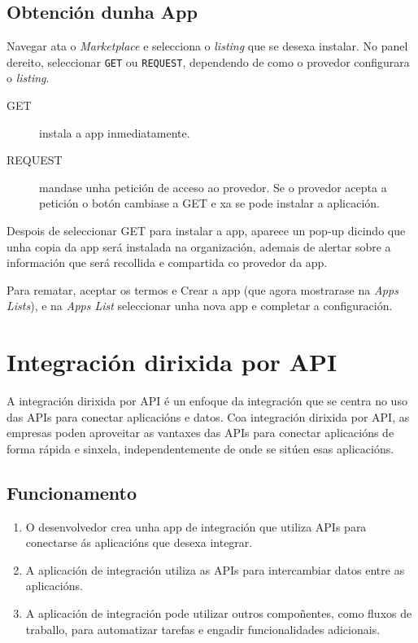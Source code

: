 \subsection{Obtención dunha App}

Navegar ata o \textit{Marketplace} e  selecciona o \textit{listing} que se desexa instalar. No panel dereito, seleccionar \texttt{GET} ou \texttt{REQUEST}, dependendo de como o provedor configurara o \textit{listing}.

\begin{description}
    \item[GET] instala a app inmediatamente.
    \item[REQUEST] mandase unha petición de acceso ao provedor. Se o provedor acepta a petición o botón cambiase a GET e xa se pode instalar a aplicación.
\end{description}

Despois de seleccionar GET para instalar a app, aparece un pop-up dicindo que unha copia da app será instalada na organización, ademais de alertar sobre a información que será recollida e compartida co provedor da app.

Para rematar, aceptar os termos e Crear a app (que agora mostrarase na \textit{Apps Lists}), e na \textit{Apps List} seleccionar unha nova app e completar a configuración.

\section{Integración dirixida por API}

    A integración dirixida por API é un enfoque da integración que se centra no uso das APIs para conectar aplicacións e datos. Coa integración dirixida por API, as empresas poden aproveitar as vantaxes das APIs para conectar aplicacións de forma rápida e sinxela, independentemente de onde se sitúen esas aplicacións.
   
\subsection{Funcionamento}

\begin{enumerate}
    \item O desenvolvedor crea unha app de integración que utiliza APIs para conectarse ás aplicacións que desexa integrar.
    \item A aplicación de integración utiliza as APIs para intercambiar datos entre as aplicacións.
    \item A aplicación de integración pode utilizar outros compoñentes, como fluxos de traballo, para automatizar tarefas e engadir funcionalidades adicionais.
\end{enumerate}

